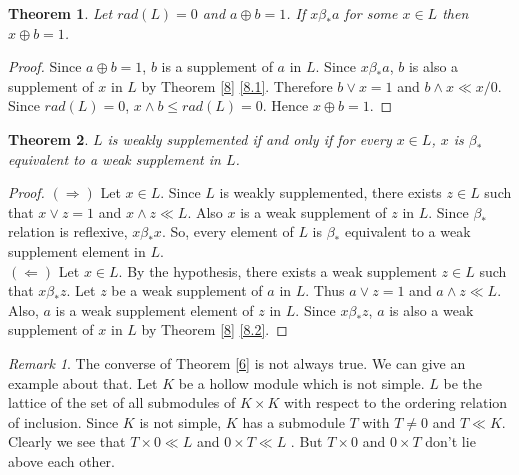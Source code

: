 \documentclass[11pt,reqno]{amsart} %
\theoremstyle{plain}
\newtheorem{theorem}{Theorem}
\theoremstyle{definition}
\theoremstyle{remark}
\newtheorem{remark}{Remark}
\numberwithin{equation}{section}
\begin{document}
\begin{theorem}\label{21}
  Let $ rad(L)=0 $ and $ a \oplus b = 1 $. If $ x \beta_* a $ for some $ x \in L $ then $ x \oplus b = 1 $. 
\end{theorem}
\begin{proof}
  Since $ a \oplus b = 1 $, $ b $ is a supplement of $ a $ in $ L $. 
  Since $ x \beta_* a $, $ b $ is also a supplement of $ x $ in $ L $ by Theorem \ref{8} \ref{8.1}. 
  Therefore $ b \vee x = 1 $ and 
  $ b \wedge x \ll x/0 $. Since $ rad(L)=0 $, $ x \wedge b \leq rad(L) = 0 $. Hence $ x \oplus b = 1 $.
\end{proof}

\begin{theorem}
  $ L $ is weakly supplemented if and only if for every $ x \in L $, $ x $ is $ \beta_* $ equivalent to a weak supplement in $ L $.
\end{theorem}

\begin{proof}
  $ ( \Rightarrow ) $ 
  Let $ x \in L $. Since $ L $ is weakly supplemented, there exists $ z \in L $ such that 
  $ x \vee z = 1 $ and $ x \wedge z \ll L $. Also $ x $ is a weak supplement of $ z $ in $ L $. 
  Since $ \beta_* $ relation is reflexive, $ x \beta_* x $. So, every element of $ L $ is 
  $ \beta_* $ equivalent to a weak supplement element in $ L $. \\
  $ ( \Leftarrow ) $
  Let $ x \in L $. By the hypothesis, there exists a weak supplement $ z \in L $ such that 
  $ x \beta_* z $. Let $ z $ be a weak supplement of $ a $ in $ L $. Thus $ a \vee z = 1 $ and $ a \wedge z \ll L $. 
  Also, $ a $ is a weak supplement element of $ z $ in $ L $. Since $ x \beta_* z $, 
  $ a $ is also a weak supplement of $ x $ in $ L $ by Theorem \ref{8} \ref{8.2}.  
\end{proof}
\begin{remark}
  The converse of Theorem \ref{6} is not always true. We can give an example about that. Let $ K $ be a hollow module which is not simple. 
  $ L $ be the lattice of the set of all submodules of $ K \times K $ with respect to the ordering relation of inclusion. 
  Since $ K $ is not simple, $ K $ has a submodule $ T $ with $ T \neq 0 $ and $ T \ll K $. Clearly we see that $ T \times 0 \ll L $ and $ 0 \times T \ll L $ . 
  But $ T \times 0 $ and $ 0 \times T $ don't lie above each other.
\end{remark}
\nocite{*}


\end{document}
